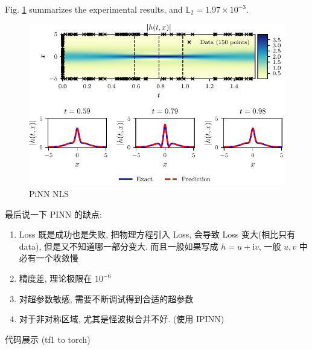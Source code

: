 \documentclass[lang=cn,a4paper,newtx]{elegantpaper}
\renewcommand{\i}{\mathrm{i}}
\begin{document}
Fig. \ref{fig:NLS} summarizes the experimental results, and $\mathbb{L}_2 = 1.97 \times 10^{-3}$.
\begin{figure}[ht]
    \centering
    \includegraphics[width=\textwidth]{images/NLS.pdf}
    \caption{PiNN NLS}
    \label{fig:NLS}
\end{figure}

最后说一下 PINN 的缺点: 
\begin{enumerate}
    \item Loss 既是成功也是失败, 把物理方程引入 Loss, 会导致 Loss 变大(相比只有 data), 但是又不知道哪一部分变大. 而且一般如果写成 $ h = u+ \i v $, 一般 $ u, v $ 中必有一个收敛慢
    \item 精度差, 理论极限在 $ 10^{-6} $
    \item 对超参数敏感, 需要不断调试得到合适的超参数
    \item 对于非对称区域, 尤其是怪波拟合并不好. (使用 IPINN)
\end{enumerate}

代码展示 (tf1 to torch)



\printbibliography[heading=bibintoc, title=\ebibname]
\end{document}
